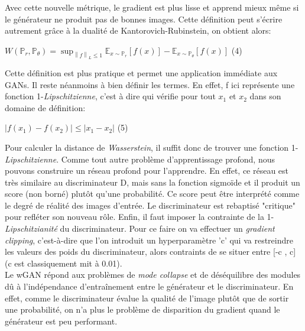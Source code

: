 \documentclass[12pt, oneside, a4paper, titlepage]{article}
\begin{document}
\vspace{5mm} 

Avec cette nouvelle métrique, le gradient est plus lisse et apprend mieux même si le générateur ne produit pas de bonnes images. Cette définition peut s'écrire autrement grâce à la dualité de Kantorovich-Rubinstein, on obtient alors:\vspace{5mm} 

\centerline{\(W(\mathbb{P}_{r},\mathbb{P}_{\theta }) = \sup_{\left \| f \right \|_{L} \leq 1}\mathbb{E}_{x\sim \mathbb{P}_{r } }[f(x)] - \mathbb{E}_{x\sim \mathbb{P}_{\theta } }[f(x)]\) (4)}
\vspace{5mm}

Cette définition est plus pratique et permet une application immédiate aux GANs. Il reste néanmoins à bien définir les termes. En effet, f ici représente une fonction 1-\textit{Lipschitzienne}, c'est à dire qui vérifie pour tout  \(x_{1}\) et \(x_{2}\) dans son domaine de définition: \vspace{5mm} 

\centerline{\(\left | f(x_{1}) - f(x_{2}) \right |\leq \left |x_{1} - x_{2}\right |\) (5)}
\vspace{5mm}

Pour calculer la distance de \textit{Wasserstein}, il suffit donc de trouver une fonction 1-\textit{Lipschitzienne}. Comme tout autre problème d'apprentissage profond, nous pouvons construire un réseau profond pour l'apprendre. En effet, ce réseau est très similaire au discriminateur D, mais sans la fonction sigmoïde et il produit un score (non borné) plutôt qu'une probabilité. Ce score peut être interprété comme le degré de réalité des images d'entrée. Le discriminateur est rebaptisé "critique" pour refléter son nouveau rôle. 
Enfin, il faut imposer la contrainte de la 1-\textit{Lipschitzianité} du discriminateur. Pour ce faire on va effectuer un\textit{ gradient clipping},  c'est-à-dire que l'on introduit un hyperparamètre 'c' qui va restreindre les valeurs des poids du discriminateur, alors contraints de se situer entre [-c , c] (c est classiquement mit à 0.01).\\

Le wGAN répond aux problèmes de \textit{mode collapse} et de déséquilibre des modules dû à l'indépendance d'entraînement entre le générateur et le discriminateur. En effet, comme le discriminateur évalue la qualité de l'image plutôt que de sortir une probabilité, on n'a plus le problème de disparition du gradient quand le générateur est peu performant.
\end{document}
